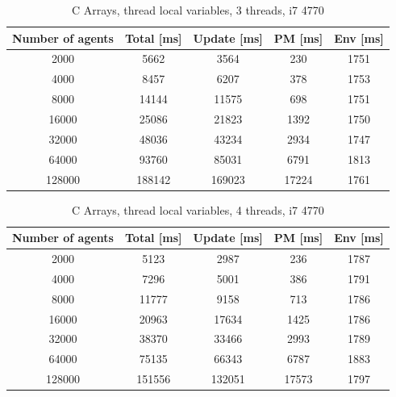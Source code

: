 \documentclass[12pt, a4paper]{report}
\begin{document}
\begin{appendices}
\begin{table}[H]
  \begin{center}
    \begin{tabular}{|c||c||c|c|c|}
    \hline
    Number of agents & Total [ms] & Update [ms] & PM [ms] & Env [ms] \\ \hline
    2000             & 5662       & 3564        & 230     & 1751     \\
    4000             & 8457       & 6207        & 378     & 1753     \\
    8000             & 14144      & 11575       & 698     & 1751     \\
    16000            & 25086      & 21823       & 1392    & 1750     \\
    32000            & 48036      & 43234       & 2934    & 1747     \\
    64000            & 93760      & 85031       & 6791    & 1813     \\
    128000           & 188142     & 169023      & 17224   & 1761     \\ \hline
     \end{tabular}
    \caption {C Arrays, thread local variables, 3 threads, i7 4770}
    \label{table:append-c-arrays-3-thread-line}
  \end{center}
\end{table}

\begin{table}[H]
  \begin{center}
    \begin{tabular}{|c||c||c|c|c|}
    \hline
    Number of agents & Total [ms] & Update [ms] & PM [ms] & Env [ms] \\ \hline
    2000             & 5123       & 2987        & 236     & 1787     \\
    4000             & 7296       & 5001        & 386     & 1791     \\
    8000             & 11777      & 9158        & 713     & 1786     \\
    16000            & 20963      & 17634       & 1425    & 1786     \\
    32000            & 38370      & 33466       & 2993    & 1789     \\
    64000            & 75135      & 66343       & 6787    & 1883     \\
    128000           & 151556     & 132051      & 17573   & 1797     \\ \hline
     \end{tabular}
    \caption {C Arrays, thread local variables, 4 threads, i7 4770}
    \label{table:append-c-arrays-4-thread-line}
  \end{center}
\end{table}


\end{appendices}
\end{document}
